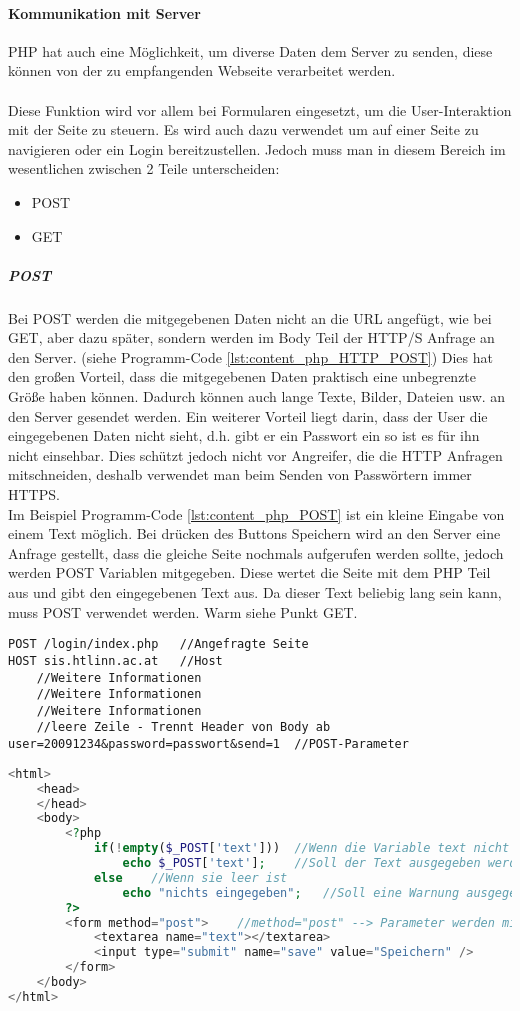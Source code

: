 \paragraph{Kommunikation mit Server}
PHP hat auch eine Möglichkeit, um diverse Daten dem Server zu 
senden, diese können von der zu empfangenden Webseite verarbeitet werden.\\\\
Diese Funktion wird vor allem bei Formularen eingesetzt, um die User-Interaktion mit der Seite zu steuern. Es wird auch dazu verwendet um auf einer Seite zu navigieren oder ein Login bereitzustellen. Jedoch muss man in diesem Bereich im wesentlichen zwischen 2 Teile unterscheiden:
\begin{itemize}
    \item POST
    \item GET
\end{itemize}
\subparagraph{POST}
Bei POST werden die mitgegebenen Daten nicht an die URL angefügt, wie bei GET, aber dazu später, sondern werden im Body Teil der HTTP/S Anfrage an den Server. (siehe Programm-Code \ref{lst:content_php_HTTP_POST}) Dies hat den großen Vorteil, dass die mitgegebenen Daten praktisch eine unbegrenzte Größe haben können. Dadurch können auch lange Texte, Bilder, Dateien usw. an den Server gesendet werden. Ein weiterer Vorteil liegt darin, dass der User die eingegebenen Daten nicht sieht, d.h. gibt er ein Passwort ein so ist es für ihn nicht einsehbar. Dies schützt jedoch nicht vor Angreifer, die die HTTP Anfragen mitschneiden, deshalb verwendet man beim Senden von Passwörtern immer HTTPS.\\
Im Beispiel Programm-Code \ref{lst:content_php_POST} ist ein kleine Eingabe von einem Text möglich. Bei drücken des Buttons Speichern wird an den Server eine Anfrage gestellt, dass die gleiche Seite nochmals aufgerufen werden sollte, jedoch werden POST Variablen mitgegeben. Diese wertet die Seite mit dem PHP Teil aus und gibt den eingegebenen Text aus. Da dieser Text beliebig lang sein kann, muss POST verwendet werden. Warm siehe Punkt GET.
\begin{lstlisting}[style=custom, caption={Ausschnitt HTTP POST Request},label={lst:content_php_HTTP_POST}]
POST /login/index.php	//Angefragte Seite
HOST sis.htlinn.ac.at	//Host
	//Weitere Informationen
	//Weitere Informationen
	//Weitere Informationen
	//leere Zeile - Trennt Header von Body ab
user=20091234&password=passwort&send=1	//POST-Parameter
\end{lstlisting}
\begin{lstlisting}[style=custom, language=PHP, caption={Beispiel POST},label={lst:content_php_POST}]
<html>
	<head>
	</head>
	<body>
		<?php
			if(!empty($_POST['text']))	//Wenn die Variable text nicht leer ist
				echo $_POST['text'];	//Soll der Text ausgegeben werden
			else	//Wenn sie leer ist
				echo "nichts eingegeben";	//Soll eine Warnung ausgegeben werden
		?>
		<form method="post">	//method="post" --> Parameter werden mit POST mitgegeben
			<textarea name="text"></textarea>
			<input type="submit" name="save" value="Speichern" />
		</form>
	</body>
</html>
\end{lstlisting}
